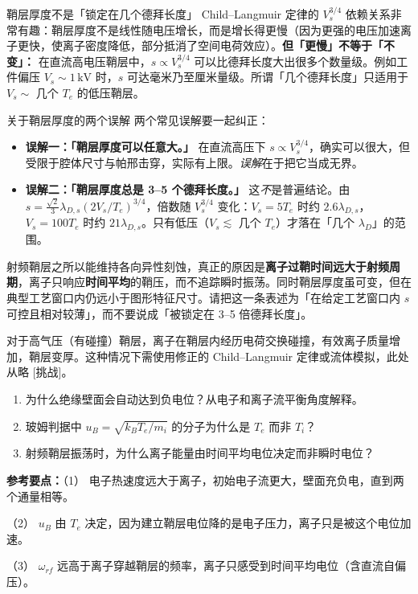 \documentclass[12pt,a4paper,openany,oneside]{book}
\newcommand{\quizans}[1]{\par\medskip{\color{figGray}\rule{\linewidth}{0.3pt}}\par\smallskip
  {\footnotesize\textbf{参考要点：}#1}}
\begin{document}
\begin{insight}{鞘层厚度不是「锁定在几个德拜长度」}{}
Child--Langmuir 定律的 $V_s^{3/4}$ 依赖关系非常有趣：鞘层厚度不是线性随电压增长，而是增长得更慢（因为更强的电压加速离子更快，使离子密度降低，部分抵消了空间电荷效应）。\textbf{但「更慢」不等于「不变」：} 在直流高电压鞘层中，$s\propto V_s^{3/4}$ 可以比德拜长度大出很多个数量级。例如工件偏压 $V_s\sim1\,\mathrm{kV}$ 时，$s$ 可达毫米乃至厘米量级。所谓「几个德拜长度」只适用于 $V_s\sim$ 几个 $T_e$ 的低压鞘层。
\end{insight}

\begin{warning}{关于鞘层厚度的两个误解}{}
两个常见误解要一起纠正：
\begin{itemize}
\item \textbf{误解一：「鞘层厚度可以任意大。」} 在直流高压下 $s\propto V_s^{3/4}$，确实可以很大，但受限于腔体尺寸与帕邢击穿，实际有上限。\emph{误解}在于把它当成无界。
\item \textbf{误解二：「鞘层厚度总是 3--5 个德拜长度。」} 这\emph{不}是普遍结论。由 $s=\tfrac{\sqrt2}{3}\lambda_{D,s}(2V_s/T_e)^{3/4}$，倍数随 $V_s^{3/4}$ 变化：$V_s=5T_e$ 时约 $2.6\lambda_{D,s}$，$V_s=100T_e$ 时约 $21\lambda_{D,s}$。只有低压（$V_s\lesssim$ 几个 $T_e$）才落在「几个 $\lambda_D$」的范围。
\end{itemize}
射频鞘层之所以能维持各向异性刻蚀，真正的原因是\textbf{离子过鞘时间远大于射频周期}，离子只响应\textbf{时间平均}的鞘压，而不追踪瞬时振荡。同时鞘层厚度虽可变，但在典型工艺窗口内仍远小于图形特征尺寸。请把这一条表述为「在给定工艺窗口内 $s$ 可控且相对较薄」，而不要说成「被锁定在 3--5 倍德拜长度」。
\end{warning}

对于高气压（有碰撞）鞘层，离子在鞘层内经历电荷交换碰撞，有效离子质量增加，鞘层变厚。这种情况下需使用修正的 Child--Langmuir 定律或流体模拟，此处从略 [挑战]。

\begin{miniquiz}
\begin{enumerate}
\item 为什么绝缘壁面会自动达到负电位？从电子和离子流平衡角度解释。
\item 玻姆判据中 $u_B = \sqrt{k_B T_e/m_i}$ 的分子为什么是 $T_e$ 而非 $T_i$？
\item 射频鞘层振荡时，为什么离子能量由时间平均电位决定而非瞬时电位？
\end{enumerate}
\quizans{（1） 电子热速度远大于离子，初始电子流更大，壁面充负电，直到两个通量相等。\par （2） $u_B$ 由 $T_e$ 决定，因为建立鞘层电位降的是电子压力，离子只是被这个电位加速。\par （3） $\omega_{rf}$ 远高于离子穿越鞘层的频率，离子只感受到时间平均电位（含直流自偏压）。}
\end{miniquiz}
\end{document}
